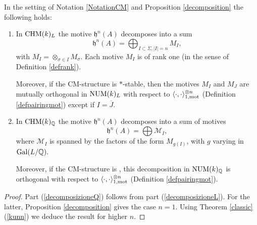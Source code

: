 \documentclass[11pt]{amsart}
\begin{document}
\begin{proposition}\label{primadecomposizione}
In the setting of Notation \ref{NotationCM} and Proposition \ref{decomposition}  the following holds:

\begin{enumerate}


\item\label{decomposizioneL} In $\mathrm{CHM} (k)_{L}$ the motive $\mathfrak{h}^n(A)$ decomposes into a sum 
\[\mathfrak{h}^n(A) =\bigoplus_{I\subset \Sigma, \vert I \vert = n} M_I,\]
with $M_I= \otimes_{\sigma \in I}M_\sigma$. Each motive $M_I$ is of rank one (in the sense of Definition \ref{defrank}).

Moreover, if the CM-structure is $*$-stable, then the motives $M_I$ and $M_J$ are mutually orthogonal  in $\mathrm{NUM}(k)_L$ with respect to $\langle \cdot, \cdot \rangle_{1,\mathrm{mot}}^{\otimes n}$ (Definition \ref{defpairingmot}) except if $I = \overline{J}$.

\item\label{decomposizioneQ} In $\mathrm{CHM} (k)_{\mathbb{Q}}$ the motive $\mathfrak{h}^n(A)$ decomposes into a sum of motives
\[\mathfrak{h}^n(A) =\bigoplus  \mathcal{M}_I,\]
where $\mathcal{M}_I$ is spanned by the factors of the form $M_{g(I)}$, with $g$ varying in $\textnormal{Gal}(L/\mathbb{Q}).$

Moreover, if the CM-structure is , this decomposition in $\mathrm{NUM}(k)_{\mathbb{Q}}$  is orthogonal with respect to $\langle \cdot, \cdot \rangle_{1,\mathrm{mot}}^{\otimes n}$  (Definition \ref{defpairingmot}).

\end{enumerate}
\end{proposition}
\begin{proof}
Part (\ref{decomposizioneQ}) follows from part (\ref{decomposizioneL}). For the latter, Proposition \ref{decomposition} gives the case $n=1$. Using Theorem \ref{classic}(\ref{kunn}) we deduce the result for higher $n$.
\end{proof}
\end{document}
